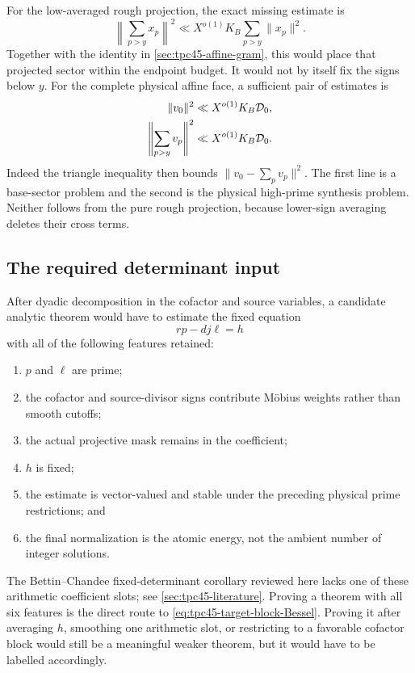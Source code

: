 For the low-averaged rough projection, the exact missing estimate is
\begin{equation}
 \boxed{
 \left\|\sum_{p>y}x_p\right\|^2
 \ll X^{o(1)}K_B
       \sum_{p>y}\|x_p\|^2.}
 \label{eq:tpc45-target-high-Bessel}
\end{equation}
Together with the identity in \cref{sec:tpc45-affine-gram}, this would
place that projected sector within the endpoint budget.  It would not
by itself fix the signs below \(y\).  For the complete physical affine
face, a sufficient pair of estimates is
\begin{align}
 \|v_0\|^2
 &\ll X^{o(1)}K_B\mathcal D_0,
 \label{eq:tpc45-target-base-vector}\\
 \left\|\sum_{p>y}v_p\right\|^2
 &\ll X^{o(1)}K_B\mathcal D_0.
 \label{eq:tpc45-target-physical-synthesis}
\end{align}
Indeed the triangle inequality then bounds
\(\|v_0-\sum_pv_p\|^2\).  The first line is a base-sector problem and
the second is the physical high-prime synthesis problem.  Neither
follows from the pure rough projection, because lower-sign averaging
deletes their cross terms.

\subsection{The required determinant input}

After dyadic decomposition in the cofactor and source variables, a
candidate analytic theorem would have to estimate the fixed equation
\begin{equation}
 rp-dj\ell=h
 \label{eq:tpc45-next-fixed-determinant}
\end{equation}
with all of the following features retained:
\begin{enumerate}[label=\textup{(\roman*)},leftmargin=2.4em]
 \item \(p\) and \(\ell\) are prime;
 \item the cofactor and source-divisor signs contribute M\"obius
       weights rather than smooth cutoffs;
 \item the actual projective mask remains in the coefficient;
 \item \(h\) is fixed;
 \item the estimate is vector-valued and stable under the preceding
       physical prime restrictions; and
 \item the final normalization is the atomic energy, not the ambient
       number of integer solutions.
\end{enumerate}
The Bettin--Chandee fixed-determinant corollary reviewed here lacks one
of these arithmetic coefficient slots; see
\cref{sec:tpc45-literature}.  Proving a theorem with all six features is
the direct route to \eqref{eq:tpc45-target-block-Bessel}.  Proving it
after averaging \(h\), smoothing one arithmetic slot, or restricting to
a favorable cofactor block would still be a meaningful weaker theorem,
but it would have to be labelled accordingly.

